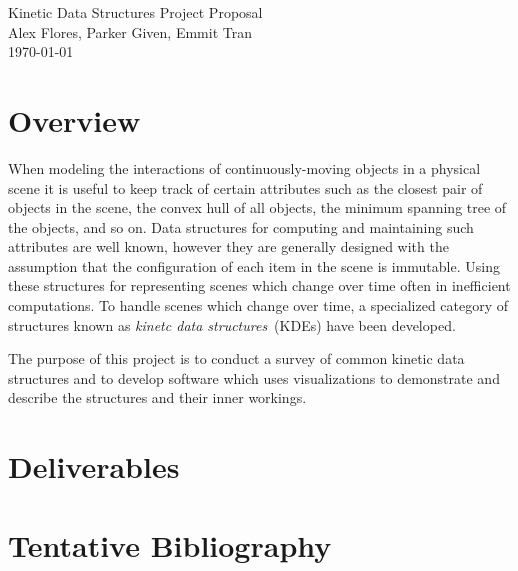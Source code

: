 \documentclass[letterpaper,oneside,12pt]{article}
\begin{document}
  \pagestyle{plain}
  \begin{center}
    {\LARGE Kinetic Data Structures Project Proposal} \\ 
    {\Large Alex Flores, Parker Given, Emmit Tran } \\
    {\large \today } \\
  \end{center}

  \section*{Overview}
  \noindent When modeling the interactions of continuously-moving objects in a physical
  scene it is useful to keep track of certain attributes such as the closest pair of
  objects in the scene, the convex hull of all objects, the minimum spanning tree of
  the objects, and so on. Data structures for computing and maintaining
  such attributes are well known, however they are generally designed with the assumption
  that the configuration of each item in the scene is immutable. Using these structures 
  for representing scenes which change over time often in inefficient computations. 
  To handle scenes which change over time, a specialized category of structures known as
  \textit{kinetc data structures}~(KDEs) have been developed.
  
  \noindent The purpose of this project is to conduct a survey of common kinetic data
  structures and to develop software which uses visualizations to demonstrate and describe
  the structures and their inner workings.

  \section*{Deliverables}

  \section*{Tentative Bibliography}
\end{document}
